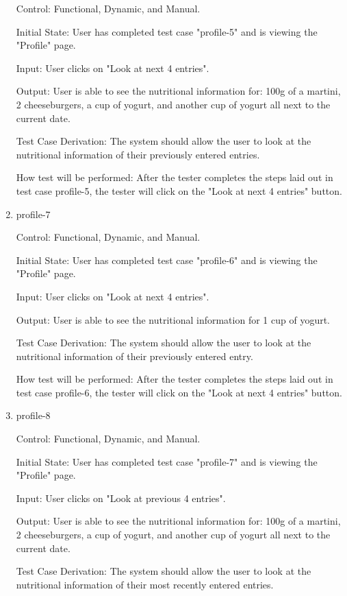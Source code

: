 \documentclass[12pt, titlepage]{article}
\begin{document}
\begin{enumerate}
		Control: Functional, Dynamic, and Manual.
		
		Initial State: User has completed test case "profile-5" and is viewing the "Profile" page.
		
		Input: User clicks on "Look at next 4 entries".
		
		Output: User is able to see the nutritional information for: 100g of a martini, 2 cheeseburgers, a cup of yogurt, and another cup of yogurt all next to the current date.
		
		Test Case Derivation: The system should allow the user to look at the nutritional information of their previously entered entries.
		
		How test will be performed: After the tester completes the steps laid out in test case profile-5, the tester will click on the "Look at next 4 entries" button.
		
		\item{profile-7\\}
		
		Control: Functional, Dynamic, and Manual.
		
		Initial State: User has completed test case "profile-6" and is viewing the "Profile" page.
		
		Input: User clicks on "Look at next 4 entries".
		
		Output: User is able to see the nutritional information for 1 cup of yogurt.
		
		Test Case Derivation: The system should allow the user to look at the nutritional information of their previously entered entry.
		
		How test will be performed: After the tester completes the steps laid out in test case profile-6, the tester will click on the "Look at next 4 entries" button.
		
		\item{profile-8\\}
		
		Control: Functional, Dynamic, and Manual.
		
		Initial State: User has completed test case "profile-7" and is viewing the "Profile" page.
		
		Input: User clicks on "Look at previous 4 entries".
		
		Output: User is able to see the nutritional information for: 100g of a martini, 2 cheeseburgers, a cup of yogurt, and another cup of yogurt all next to the current date.
		
		Test Case Derivation: The system should allow the user to look at the nutritional information of their most recently entered entries.
		

\end{enumerate}
\end{document}
